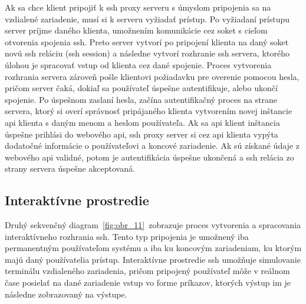 Ak sa chce klient pripojiť k ssh proxy serveru s úmyslom pripojenia sa na vzdialené zariadenie, musí si k serveru vyžiadať
prístup.
Po vyžiadaní prístupu server príjme daného klienta, umožnením komunikácie cez soket s cieľom otvorenia spojenia ssh.
Preto server vytvorí po pripojení klienta na daný soket novú ssh reláciu (ssh session) a následne vytvorí rozhranie ssh servera,
ktorého úlohou je spracovať vstup od klienta cez dané spojenie.
Proces vytvorenia rozhrania servera zároveň pošle klientovi požiadavku pre overenie pomocou hesla, pričom server čaká, dokiaľ
sa používateľ úspešne autentifikuje, alebo ukončí spojenie.
Po úspešnom zaslaní hesla, začína autentifikačný proces na strane servera, ktorý si overí správnosť pripájaného klienta vytvorením
novej inštancie api klienta s daným menom a heslom používateľa.
Ak sa api klient inštancia úspešne prihlási do webového api, ssh proxy server si cez api klienta vypýta dodatočné informácie o
používateľovi a koncové zariadenie.
Ak sú získané údaje z webového api validné, potom je autentifikácia úspešne ukončená a ssh relácia zo strany servera úspešne akceptovaná.

\subsection{Interaktívne prostredie}\label{subsec:interkativne-prostredie}

Druhý sekvenčný diagram~\ref{fig:obr_11}~zobrazuje proces vytvorenia a spracovania interaktívneho rozhrania ssh.
Tento typ pripojenia je umožnený iba permanentným používateľom systému a iba ku koncovým zariadeniam, ku ktorým majú daný
používatelia prístup.
Interaktívne prostredie ssh umožňuje simulovanie terminálu vzdialeného zariadenia, pričom pripojený používateľ môže v reálnom
čase posielať na dané zariadenie vstup vo forme príkazov, ktorých výstup im je následne zobrazovaný na výstupe.


